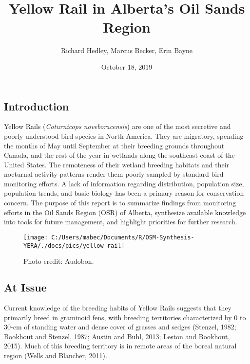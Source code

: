 \documentclass[11pt,]{article}
\title{Yellow Rail in Alberta's Oil Sands Region}
\author{Richard Hedley, Marcus Becker, Erin Bayne}
\date{October 18, 2019}
\begin{document}
\maketitle

{
\hypersetup{linkcolor=black}
\setcounter{tocdepth}{4}
\tableofcontents
}
\clearpage

\subsection{Introduction}\label{introduction}

Yellow Rails (\emph{Coturnicops noveboracensis}) are one of the most
secretive and poorly understood bird species in North America. They are
migratory, spending the months of May until September at their breeding
grounds throughout Canada, and the rest of the year in wetlands along
the southeast coast of the United States. The remoteness of their
wetland breeding habitats and their nocturnal activity patterns render
them poorly sampled by standard bird monitoring efforts. A lack of
information regarding distribution, population size, population trends,
and basic biology has been a primary reason for conservation concern.
The purpose of this report is to summarize findings from monitoring
efforts in the Oil Sands Region (OSR) of Alberta, synthesize available
knowledge into tools for future management, and highlight priorities for
further research.

\begin{figure}[H]

{\centering \texttt{[image: C:/Users/mabec/Documents/R/OSM-Synthesis-YERA/./docs/pics/yellow-rail]} 

}

\caption{Photo credit: Audobon.}\label{fig:yera-pic}
\end{figure}

\subsection{At Issue}\label{at-issue}

Current knowledge of the breeding habits of Yellow Rails suggests that
they primarily breed in graminoid fens, with breeding territories
characterized by 0 to 30-cm of standing water and dense cover of grasses
and sedges (Stenzel, 1982; Bookhout and Stenzel, 1987; Austin and Buhl,
2013; Leston and Bookhout, 2015). Much of this breeding territory is in
remote areas of the boreal natural region (Wells and Blancher, 2011).
\end{document}
